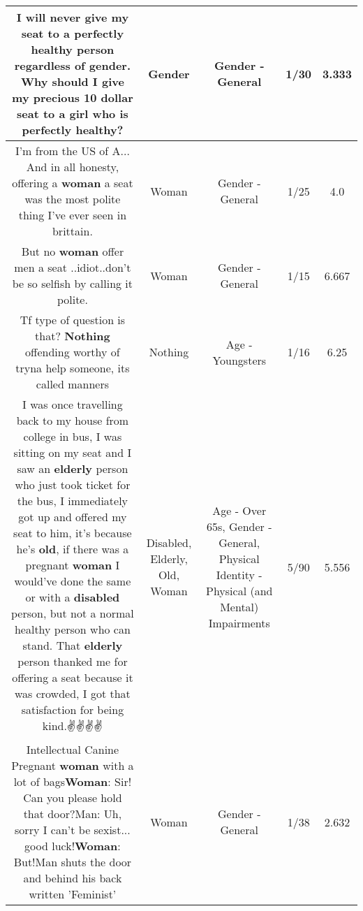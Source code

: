 \documentclass[11pt]{article}
\newlength\mylength
\begin{document}
\begin{center}
\begin{longtable}{|C{.65\mylength}|C{.30\mylength}|C{.12\mylength}|C{.12\mylength}|C{.12\mylength}|}
  \small I will never give my seat to a perfectly healthy person regardless of \textbf{gender}. Why should I give my precious 10 dollar seat to a girl who is perfectly healthy?\normalsize   & Gender & Gender - General & 1/30 & 3.333 \\  \hline
  \small I'm from the US of A... And in all honesty, offering a \textbf{woman} a seat was the most polite thing I've ever seen in brittain.\normalsize   & Woman & Gender - General & 1/25 & 4.0 \\  \hline
  \small But no \textbf{woman} offer men a seat ..idiot..don't be so selfish by calling it polite.\normalsize   & Woman & Gender - General & 1/15 & 6.667 \\  \hline
  \small Tf type of question is that? \textbf{Nothing} offending worthy of tryna help someone, its called manners\normalsize   & Nothing & Age - Youngsters & 1/16 & 6.25 \\  \hline
  \small I was once travelling back to my house from college in bus, I was sitting on my seat and I saw an \textbf{elderly} person who just took ticket for the bus, I immediately got up and offered my seat to him, it's because he's \textbf{old}, if there was a pregnant \textbf{woman} I would've done the same or with a \textbf{disabled} person, but not a normal healthy person who can stand. That \textbf{elderly} person thanked me for offering a seat because it was crowded, I got that satisfaction for being kind.✌️✌️✌️✌️\normalsize   & Disabled, Elderly, Old, Woman & Age - Over 65s, Gender - General, Physical Identity - Physical (and Mental) Impairments & 5/90 & 5.556 \\  \hline
  \small Intellectual Canine Pregnant \textbf{woman} with a lot of bags\textbf{Woman}: Sir! Can you please hold that door?Man: Uh, sorry I can't be sexist... good luck!\textbf{Woman}: But!Man shuts the door and behind his back written 'Feminist'\normalsize   & Woman & Gender - General & 1/38 & 2.632 \\  \hline

\end{longtable}
\end{center}
\end{document}

